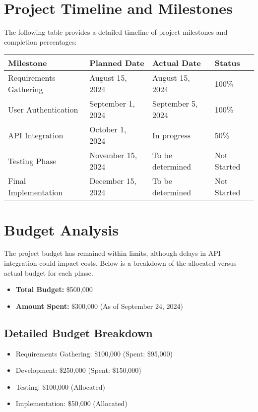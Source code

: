 \documentclass[12pt]{article}
\begin{document}
\section{Project Timeline and Milestones}
The following table provides a detailed timeline of project milestones and completion percentages:

\begin{center}
\begin{table}[h]
\small
\begin{tabular}{|m{4cm}|m{4cm}|m{4cm}|m{2cm}|}
\hline
\textbf{Milestone} & \textbf{Planned Date} & \textbf{Actual Date} & \textbf{Status} \\
\hline
Requirements Gathering & August 15, 2024 & August 15, 2024 & 100\% \\
\hline
User Authentication & September 1, 2024 & September 5, 2024 & 100\% \\
\hline
API Integration & October 1, 2024 & In progress & 50\% \\
\hline
Testing Phase & November 15, 2024 & To be determined & Not Started \\
\hline
Final Implementation & December 15, 2024 & To be determined & Not Started \\
\hline
\end{tabular}
\end{table}
\end{center}

\section{Budget Analysis}
The project budget has remained within limits, although delays in API integration could impact costs. Below is a breakdown of the allocated versus actual budget for each phase.

\begin{itemize}
    \item \textbf{Total Budget:} \$500,000
    \item \textbf{Amount Spent:} \$300,000 (As of September 24, 2024)
\end{itemize}

\subsection*{Detailed Budget Breakdown}
\begin{itemize}
    \item Requirements Gathering: \$100,000 (Spent: \$95,000)
    \item Development: \$250,000 (Spent: \$150,000)
    \item Testing: \$100,000 (Allocated)
    \item Implementation: \$50,000 (Allocated)
\end{itemize}
\end{document}
